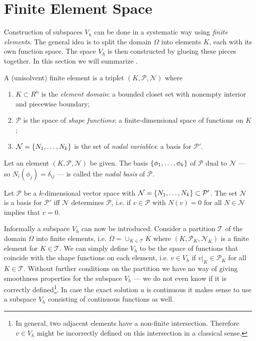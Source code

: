 \documentclass[thesis.tex]{subfiles}
\begin{document}
\section{Finite Element Space}
  Construction of subspaces $V_h$ can be done in a systematic way using \emph{finite elements}. 
  The general idea is to split the domain $\Omega$ into elements $K$, each with its own function space.
  The space $V_h$ is then constructed by glueing these pieces together. In this section we will summarize \cite[Ch~3]{brenner}.
  \begin{defn} 
    A (unisolvent) finite element is a triplet $(K, \mathcal{P}, \mathcal{N})$ where
    \begin{enumerate}[label=(\alph*)]
      \item $K \subset R^n$ is the \emph{element domain}: a bounded closet set with nonempty interior and piecewise boundary;
    \item $\mathcal{P}$ is the space of \emph{shape functions}: a finite-dimensional space of functions on $K$;
  \item $\mathcal{N} = \set{N_1, \dots, N_k}$ is the set of \emph{nodal variables}: a basis for $\mathcal{P}'$.
    \end{enumerate}
  \end{defn}
  \begin{defn}
    Let an element $(K, \mathcal{P}, \mathcal{N})$ be given. The basis $\set{\phi_1, \dots, \phi_k}$ of $\mathcal{P}$ dual to $\mathcal{N}$ --- so $N_i(\phi_j) = \delta_{ij}$ --- is called the \emph{nodal basis} of $\mathcal{P}$.
  \end{defn}
  \begin{lem}
    Let $\mathcal{P}$ be a $k$-dimensional vector space with $\mathcal{N} = \set{N_1, \dots, N_k} \subset \mathcal{P}'$.
    The set $\mathcal{N}$ is a basis for $\mathcal{P}'$ iff $\mathcal{N}$ determines $\mathcal{P}$, i.e. if $v \in \mathcal{P}$ with $N(v) = 0$ for all $N \in \mathcal{N}$ implies that $v = 0$.
  \end{lem}
  Informally a subspace $V_h$ can now be introduced. Consider a partition $\mathcal{T}$ of the domain $\Omega$ into finite elements,
  i.e. $\overline{\Omega} = \cup_{K \in \mathcal{T}} K$ where $(K, \mathcal{P}_K, \mathcal{N}_K)$ is a finite element for $K \in \mathcal{T}$.
  We can simply define $V_h$ to be the space of functions that coincide with the shape functions on each element,
  i.e. $v \in V_h$ if $v|_{K} \in \mathcal{P}_K$ for all $K \in \mathcal{T}$. 
  Without further conditions on the partition we have no way of giving smoothness  properties for the subspace $V_h$ --- we do not even know if it is correctly defined\footnote{In general, two adjacent elements have a non-finite intersection. 
  Therefore $v \in V_h$ might be incorrectly defined on this intersection in a classical sense.}.
  In case the exact solution $u$ is continuous it makes sense to use a subspace $V_h$ consisting of
  continuous functions as well. 
\end{document}
